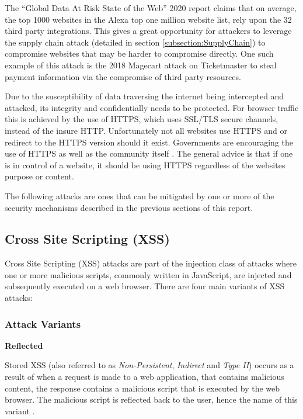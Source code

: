 \documentclass{mscreport}
\begin{document}
\vspace{0.3cm} \noindent
The ``Global Data At Risk State of the Web'' 2020 report \cite{Tala_Security2020-ee} claims that on average, the top 1000 websites in the Alexa top one million website list, rely upon the 32 third party integrations. This gives a great opportunity for attackers to leverage the supply chain attack (detailed in section \ref{subsection:SupplyChain}) to compromise websites that may be harder to compromise directly. One such example of this attack is the 2018 Magecart attack on Ticketmaster \cite{Herman2019-zb} to steal payment information via the compromise of third party resources.

\vspace{0.3cm} \noindent
Due to the susceptibility of data traversing the internet being intercepted and attacked, its integrity and confidentially needs to be protected. For browser traffic this is achieved by the use of HTTPS, which uses SSL/TLS secure channels, instead of the insure HTTP. Unfortunately not all websites use HTTPS and or redirect to the HTTPS version should it exist. Governments are encouraging the use of HTTPS \cite{noauthor_undated-oz} as well as the community itself \cite{noauthor_undated-xk}. The general advice is that if one is in control of a website, it should be using HTTPS regardless of the websites purpose or content. 

\vspace{0.3cm} \noindent
The following attacks are ones that can be mitigated by one or more of the security mechanisms described in the previous sections of this report.

\subsection{Cross Site Scripting (XSS)}
\label{subsection:XSS}

Cross Site Scripting (XSS) attacks are part of the injection class of attacks where one or more malicious scripts, commonly written in JavaScript, are injected and subsequently executed on a web browser. There are four main variants of XSS attacks:

\subsubsection{Attack Variants}
\textbf{Reflected}

\vspace{0.2cm} \noindent
Stored XSS (also referred to as \textit{Non-Persistent}, \textit{Indirect} and \textit{Type II}) occurs as a result of when a request is made to a web application, that contains malicious content, the response contains a malicious script that is executed by the web browser. The malicious script is reflected back to the user, hence the name of this variant \cite{Rodriguez2020-bg}.
\end{document}
